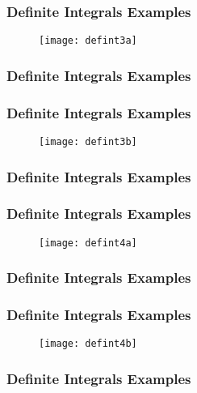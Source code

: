 \documentclass{beamer}
\begin{document}
	
	\begin{frame}
		\frametitle{Definite Integrals Examples}
		\begin{figure}
			\centering
			\texttt{[image: defint3a]}
			
		\end{figure}
		
	\end{frame}
	\begin{frame}
		\frametitle{Definite Integrals Examples}
		
	\end{frame}
	
	\begin{frame}
		\frametitle{Definite Integrals Examples}
		\begin{figure}
			\centering
			\texttt{[image: defint3b]}
			
		\end{figure}
		
	\end{frame}
	\begin{frame}
		\frametitle{Definite Integrals Examples}
		
	\end{frame}
	
	\begin{frame}
		\frametitle{Definite Integrals Examples}
		\begin{figure}
			\centering
			\texttt{[image: defint4a]}
			
		\end{figure}
		
	\end{frame}
	\begin{frame}
		\frametitle{Definite Integrals Examples}
		
	\end{frame}
	
	\begin{frame}
		\frametitle{Definite Integrals Examples}
		\begin{figure}
			\centering
			\texttt{[image: defint4b]}
			
		\end{figure}
	\end{frame}
	\begin{frame}
		\frametitle{Definite Integrals Examples}
		
	\end{frame}
	
\end{document}
